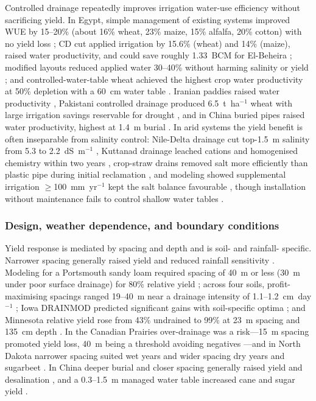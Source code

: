 \documentclass[11pt]{article}
\begin{document}
Controlled drainage repeatedly improves irrigation water-use efficiency without
sacrificing yield. In Egypt, simple management of existing systems improved WUE by
15--20\% (about 16\% wheat, 23\% maize, 15\% alfalfa, 20\% cotton) with no yield
loss \parencite{Wahba2005}; CD cut applied irrigation by 15.6\% (wheat) and 14\%
(maize), raised water productivity, and could save roughly 1.33~BCM for
El-Beheira \parencite{Mahmoud2021}; modified layouts reduced applied water 30--40\%
without harming salinity or yield \parencite{ELATFY1991}; and controlled-water-table
wheat achieved the highest crop water productivity at 50\% depletion with a 60~cm
water table \parencite{ElHassanin2022}. Iranian paddies raised water productivity
\parencite{DarziNaftchali2017b,Asgari2021}, Pakistani controlled drainage produced
6.5~t~ha$^{-1}$ wheat with large irrigation savings reservable for drought
\parencite{Khan2003,Sarwar2001}, and in China buried pipes raised water
productivity, highest at 1.4~m burial \parencite{Liu2025}. In arid systems the
yield benefit is often inseparable from salinity control: Nile-Delta drainage cut
top-1.5~m salinity from 5.3 to 2.2~dS~m$^{-1}$ \parencite{ELMOWELHI1988},
Kuttanad drainage leached cations and homogenised chemistry within two years
\parencite{Mathew2001}, crop-straw drains removed salt more efficiently than
plastic pipe during initial reclamation \parencite{Lu2018}, and modeling showed
supplemental irrigation $\geq$100~mm~yr$^{-1}$ kept the salt balance favourable
\parencite{Li2018,Sarwar2001,Zhang2024c,Yang2022,Liu2025,Guo2025}, though
installation without maintenance fails to control shallow water tables
\parencite{Malota2016}.

\subsubsection{Design, weather dependence, and boundary conditions}

Yield response is mediated by spacing and depth and is soil- and rainfall-
specific. Narrower spacing generally raised yield and reduced rainfall sensitivity
\parencite{Rui2024,Kladivko2005,Nelson2017}. Modeling for a Portsmouth sandy loam
required spacing of 40~m or less (30~m under poor surface drainage) for 80\%
relative yield \parencite{HARDJOAMIDJOJO1982}; across four soils, profit-maximising
spacings ranged 19--40~m near a drainage intensity of 1.1--1.2~cm~day$^{-1}$
\parencite{Skaggs2006}; Iowa DRAINMOD predicted significant gains with
soil-specific optima \parencite{Arora2024}; and Minnesota relative yield rose from
43\% undrained to 99\% at 23~m spacing and 135~cm depth \parencite{Sands2015}. In
the Canadian Prairies over-drainage was a risk---15~m spacing promoted yield loss,
40~m being a threshold avoiding negatives \parencite{Cordeiro2015}---and in North
Dakota narrower spacing suited wet years and wider spacing dry years and sugarbeet
\parencite{Acharya2019}. In China deeper burial and closer spacing generally
raised yield and desalination \parencite{Liu2025,Yang2022,Guo2025,Hou2018}, and a
0.3--1.5~m managed water table increased cane and sugar yield \parencite{CAMP1982}.
\end{document}
